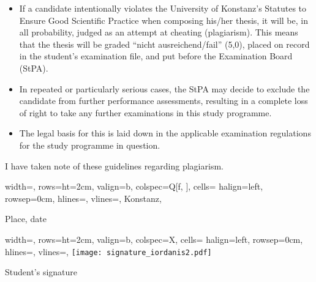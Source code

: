 \documentclass[a4paper,11pt,xcolor=dvipsnames]{article}
\begin{document}
{\begin{itemize}[label=\color{kon4}--, leftmargin=1.45cm, labelsep=0.45cm]
\item If a candidate intentionally violates the University of Konstanz's Statutes to Ensure Good Scientific Practice when composing his/her thesis, it will be, in all probability, judged as an attempt at cheating (plagiarism). This means that the thesis will be graded \enquote{nicht ausreichend/fail} (5,0), placed on record in the student's examination file, and put before the Examination Board (StPA).

\item In repeated or particularly serious cases, the StPA may decide to exclude the candidate from further performance assessments, resulting in a complete loss of right to take any further examinations in this study programme.

\item The legal basis for this is laid down in the applicable examination regulations for the study programme in question.
\end{itemize}

I have taken note of these guidelines regarding plagiarism.

\vspace{0.75cm}

\begin{minipage}{0.3\textwidth}

    \begin{tblr}{
        width=\linewidth,
        rows={ht=2cm, valign=b},
        colspec={Q[f, \linewidth]},
        cells= {halign=left},
        rowsep=0cm,
        hlines={},
        vlines={},
    }
   Konstanz, \@submitdate\\
    \end{tblr}

    \vspace{0.1cm}

    Place, date
\end{minipage}\begin{minipage}{0.1\textwidth}
     \phantom{a}
\end{minipage}\begin{minipage}{0.6\textwidth}
    \begin{tblr}{
        width=\linewidth,
        rows={ht=2cm, valign=b},
        colspec={X},
        cells= {halign=left},
        rowsep=0cm,
        hlines={},
        vlines={},
    }
   \texttt{[image: signature\_iordanis2.pdf]}\\
    \end{tblr}

    \vspace{0.1cm}

    \raggedleft Student's signature
\end{minipage}
}
\end{document}
